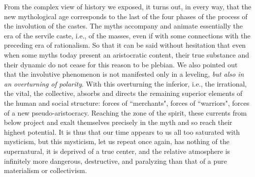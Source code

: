 From the complex view of history we exposed, it turns out, in every way, that the new mythological age corresponds to the last of the four phases of the process of the involution of the castes. The myths accompany and animate essentially the era of the servile caste, i.e., of the masses, even if with some connections with the preceding era of rationalism. So that it can be said without hesitation that even when some myths today present an aristocratic content, their true substance and their dynamic do not cease for this reason to be plebian. We also pointed out that the involutive phenomenon is not manifested only in a leveling, \emph{but also in an overturning of polarity}. With this overturning the inferior, i.e., the irrational, the vital, the collective, absorbs and directs the remaining superior elements of the human and social structure: forces of ``merchants", forces of ``warriors", forces of a new pseudo-aristocracy. Reaching the zone of the spirit, these currents from below project and exalt themselves precisely in the myth and so reach their highest potential. It is thus that our time appears to us all too saturated with mysticism, but this mysticism, let us repeat once again, has nothing of the supernatural, it is deprived of a true center, and the relative atmosphere is infinitely more dangerous, destructive, and paralyzing than that of a pure materialism or collectivism.

